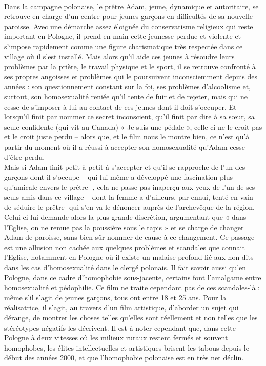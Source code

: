 \documentclass[12pt]{amsart}
\begin{document}
\paragraph{}
Dans la campagne polonaise, le prêtre Adam, jeune, dynamique et autoritaire, se retrouve en charge d’un centre pour jeunes garçons en difficultés de sa nouvelle paroisse. Avec une démarche assez éloignée du conservatisme religieux qui reste important en Pologne, il prend en main cette jeunesse perdue et violente et s’impose rapidement comme une figure charismatique très respectée dans ce village où il s’est installé. Mais alors qu’il aide ces jeunes à résoudre leurs problèmes par la prière, le travail physique et le sport, il se retrouve confronté à ses propres angoisses et problèmes qui le poursuivent inconsciemment depuis des années : son questionnement constant sur la foi, ses problèmes d’alcoolisme et, surtout, son homosexualité reniée qu’il tente de fuir et de rejeter, mais qui ne cesse de s’imposer à lui au contact de ces jeunes dont il doit s’occuper. Et lorsqu’il finit par nommer ce secret inconscient, qu’il finit par dire à sa sœur, sa seule confidente (qui vit au Canada) « Je suis une pédale », celle-ci ne le croit pas et le croit juste perdu – alors que, et le film nous le montre bien, ce n’est qu’à partir du moment où il a réussi à accepter son homosexualité qu’Adam cesse d’être perdu.\\
 Mais si Adam finit petit à petit à s’accepter et qu’il se rapproche de l’un des garçons dont il s’occupe – qui lui-même a développé une fascination plus qu’amicale envers le prêtre -, cela ne passe pas inaperçu aux yeux de l’un de ses seuls amis dans ce village – dont la femme a d’ailleurs, par ennui, tenté en vain de séduire le prêtre- qui s’en va le dénoncer auprès de l’archevêque de la région. Celui-ci lui demande alors la plus grande discrétion, argumentant que « dans l’Eglise, on ne remue pas la poussière sous le tapis » et se charge de changer Adam de paroisse, sans bien sûr nommer de cause à ce changement. Ce passage est une allusion non cachée aux quelques problèmes et scandales que connait l’Eglise, notamment en Pologne où il existe un malaise profond lié aux non-dits dans les cas d'homosexualité dans le clergé polonais. Il fait savoir aussi qu’en Pologne, dans ce cadre d’homophobie sous-jacente, certains font l’amalgame entre homosexualité et pédophilie. Ce film ne traite cependant pas de ces scandales-là : même s’il s’agit de jeunes garçons, tous ont entre 18 et 25 ans. Pour la réalisatrice, il s’agit, au travers d’un film artistique, d’aborder un sujet qui dérange, de montrer les choses telles qu’elles sont réellement et non telles que les stéréotypes négatifs les décrivent. Il est à noter cependant que, dans cette Pologne à deux vitesses où les milieux ruraux restent fermés et souvent homophobes, les élites intellectuelles et artistiques brisent les tabous depuis le début des années 2000, et que l'homophobie polonaise est en très net déclin.
\end{document}
